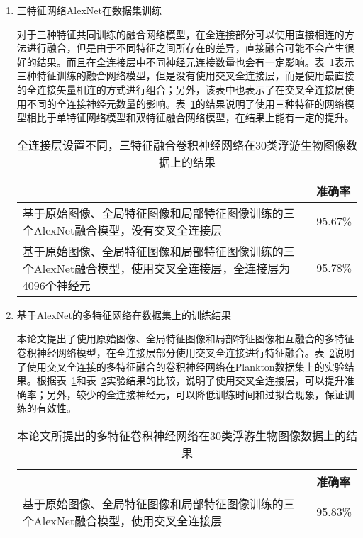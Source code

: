 \begin{enumerate}
\item 三特征网络AlexNet在数据集训练

对于三种特征共同训练的融合网络模型，在全连接部分可以使用直接相连的方法进行融合，但是由于不同特征之间所存在的差异，直接融合可能不会产生很好的结果。而且在全连接层中不同神经元连接数量也会有一定影响。表~\ref{tab:triple}表示三种特征训练的融合网络模型，但是没有使用交叉全连接层，而是使用最直接的全连接矢量相连的方式进行组合；另外，该表中也表示了在交叉全连接层使用不同的全连接神经元数量的影响。表~\ref{tab:triple}的结果说明了使用三种特征的网络模型相比于单特征网络模型和双特征融合网络模型，在结果上能有一定的提升。

\begin{table}[H]
\centering
\caption{全连接层设置不同，三特征融合卷积神经网络在30类浮游生物图像数据上的结果}
\label{tab:triple}
\begin{tabular}{|p{10cm}|p{1.8cm}<{\centering}|}
\hline
\centering{网络模型} & 准确率 \\
\hline
基于原始图像、全局特征图像和局部特征图像训练的三个AlexNet融合模型，没有交叉全连接层 &  95.67\% \\ 
\hline
基于原始图像、全局特征图像和局部特征图像训练的三个AlexNet融合模型，使用交叉全连接层，全连接层为4096个神经元  & 95.78\% \\ 
\hline
\end{tabular}
\end{table}


\item 基于AlexNet的多特征网络在数据集上的训练结果

本论文提出了使用原始图像、全局特征图像和局部特征图像相互融合的多特征卷积神经网络模型，在全连接层部分使用交叉全连接进行特征融合。表~\ref{tab:final}说明了使用交叉全连接的多特征融合的卷积神经网络在Plankton数据集上的实验结果。根据表~\ref{tab:triple}和表~\ref{tab:final}实验结果的比较，说明了使用交叉全连接层，可以提升准确率；另外，较少的全连接神经元，可以降低训练时间和过拟合现象，保证训练的有效性。

\begin{table}[H]
\centering
\caption{本论文所提出的多特征卷积神经网络在30类浮游生物图像数据上的结果}
\label{tab:final}
\begin{tabular}{|p{10cm}|p{1.8cm}<{\centering}|}
\hline
\centering{网络模型} & 准确率 \\
\hline
基于原始图像、全局特征图像和局部特征图像训练的三个AlexNet融合模型，使用交叉全连接层  & 95.83\% \\ 
\hline
\end{tabular}
\end{table}


\end{enumerate}

